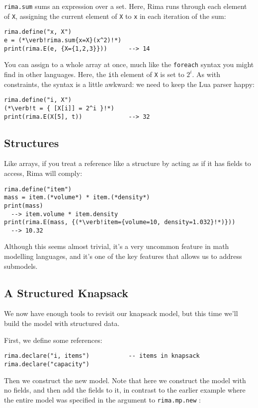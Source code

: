 \documentclass[a4paper,12pt]{article}
\begin{document}
  \lstinline!rima.sum! sums an expression over a set.
Here, Rima runs through each element of \lstinline!X!,
assigning the current element of \lstinline!X! to \lstinline!x! in each iteration of the sum:
  \begin{lstlisting}
rima.define("x, X")
e = (*\verb!rima.sum{x=X}(x^2)!*)
print(rima.E(e, {X={1,2,3}}))      --> 14
  \end{lstlisting}

  You can assign to a whole array at once, much like the \lstinline!foreach! syntax you might find in other languages.
Here, the \lstinline!i!th element of \lstinline!X! is set to $2^i$.
As with constraints, the syntax is a little awkward: we need to keep the Lua parser happy:
  \begin{lstlisting}
rima.define("i, X")
(*\verb!t = { [X[i]] = 2^i }!*)
print(rima.E(X[5], t))             --> 32
  \end{lstlisting}


\subsection{Structures}

Like arrays, if you treat a reference like a structure by acting as if it has fields to access,
Rima will comply:
  \begin{lstlisting}
rima.define("item")
mass = item.(*volume*) * item.(*density*)
print(mass)
  --> item.volume * item.density
print(rima.E(mass, {(*\verb!item={volume=10, density=1.032}!*)}))
  --> 10.32
  \end{lstlisting}

Although this seems almost trivial,
it's a very uncommon feature in math modelling languages,
and it's one of the key features that allows us to address submodels.


\subsection{A Structured Knapsack}

We now have enough tools to revisit our knapsack model,
but this time we'll build the model with structured data.

First, we define some references:
  \begin{lstlisting}
rima.declare("i, items")           -- items in knapsack
rima.declare("capacity")
  \end{lstlisting}

Then we construct the new model.
Note that here we construct the model with no fields,
and then add the fields to it,
in contrast to the earlier example where the entire model
was specified in the argument to  \lstinline!rima.mp.new! :
\end{document}
